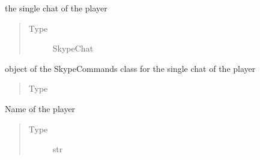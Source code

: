 \documentclass[letterpaper,10pt,english]{sphinxmanual}
\begin{document}
\begin{fulllineitems}
\begin{fulllineitems}
\begin{quote}
\begin{description}
\end{description}\end{quote}

\end{fulllineitems}


\begin{fulllineitems}
\label{\detokenize{chatwolf:chatwolf.player.Player.chat}}
the single chat of the player
\begin{quote}\begin{description}
\item[{Type}] \leavevmode
SkypeChat

\end{description}\end{quote}

\end{fulllineitems}


\begin{fulllineitems}
\label{\detokenize{chatwolf:chatwolf.player.Player.skc}}
object of the SkypeCommands class for the single chat of the player
\begin{quote}\begin{description}
\item[{Type}] \leavevmode
{\hyperref[\detokenize{chatwolf:chatwolf.skypecommands.SkypeCommands}]{}}

\end{description}\end{quote}

\end{fulllineitems}


\begin{fulllineitems}
\label{\detokenize{chatwolf:chatwolf.player.Player.name}}
Name of the player
\begin{quote}\begin{description}
\item[{Type}] \leavevmode
str


\end{description}
\end{quote}
\end{fulllineitems}
\end{fulllineitems}
\end{document}
